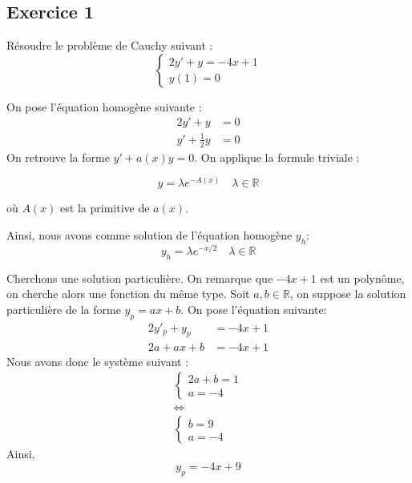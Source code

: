 \documentclass{article}
\begin{document}
\subsection{Exercice 1}
Résoudre le problème de Cauchy suivant :
\begin{equation*}
\begin{cases}
2y' + y = -4x+1\\
y(1)=0 
\end{cases}
\end{equation*}

On pose l'équation homogène suivante :
\begin{equation*}
\begin{aligned}
2y' + y &= 0 \\
y' + \frac{1}{2}y &= 0 
\end{aligned}
\end{equation*}
On retrouve la forme $y'+a(x)y = 0$. On applique la formule triviale :

\begin{equation*}
y = \lambda e^{-A(x)} \quad  \lambda\in \mathbb{R}
\end{equation*}

où $A(x)$ est la primitive de $a(x)$. 

Ainsi, nous avons comme solution de l'équation homogène $y_h$:
\begin{equation*}
y_{h} = \lambda e^{-x/2}\quad \lambda\in \mathbb{R}
\end{equation*}

Cherchons une solution particulière. On remarque que $-4x+1$ est un polynôme, on cherche alors une fonction du même type.
Soit $a,b \in \mathbb{R}$, on suppose la solution particulière de la forme $y_{p} = ax+b$.
On pose l'équation suivante:
\begin{equation*}
\begin{aligned}
 2y'_{p} + y_{p} &= -4x+1 \\
 2a + ax + b &= -4x + 1
\end{aligned}
\end{equation*}
Nous avons donc le système suivant :
\begin{equation*}
\begin{gathered}
\begin{cases}
2a+b = 1\\
a = -4
\end{cases} \\
\Leftrightarrow \\
\begin{cases}
b = 9\\
a = -4
\end{cases}
\end{gathered}
\end{equation*}
Ainsi,
\begin{equation*}
y_{p} = -4x+9
\end{equation*}
\end{document}
